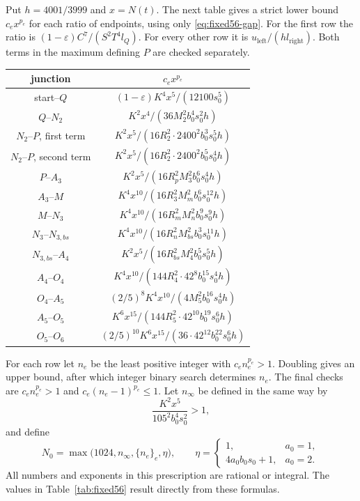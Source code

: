 \documentclass[12pt]{article}
\numberwithin{equation}{section}
\begin{document}
Put $h=4001/3999$ and $x=N(t)$.
The next table gives a strict lower bound $c_ex^{p_e}$ for each
ratio of endpoints, using only \eqref{eq:fixed56-gap}.
For the first row the ratio is $(1-\varepsilon)C^7/(S^2T^4l_Q)$.
For every other row it is $u_{\mathrm{left}}/(hl_{\mathrm{right}})$.
Both terms in the maximum defining $P$ are checked separately.
\begin{center}\small
\begin{tabular}{c|c}
junction&$c_ex^{p_e}$\\\hline
start--$Q$&$(1-\varepsilon)K^4x^5/(12100s_0^5)$\\
$Q$--$N_2$&$K^2x^4/(36M_2^2b_0^4s_0^2h)$\\
$N_2$--$P$, first term&$K^2x^5/(16R_2^2\cdot2400^2b_0^3s_0^5h)$\\
$N_2$--$P$, second term&$K^2x^5/(16R_2^2\cdot2400^2b_0^5s_0^4h)$\\
$P$--$A_3$&$K^2x^5/(16R_p^2M_3^2b_0^6s_0^4h)$\\
$A_3$--$M$&$K^4x^{10}/(16R_3^2M_m^2b_0^6s_0^{12}h)$\\
$M$--$N_3$&$K^4x^{10}/(16R_m^2M_n^2b_0^9s_0^9h)$\\
$N_3$--$N_{3,bs}$&$K^4x^{10}/(16R_n^2M_{bs}^2b_0^3s_0^{11}h)$\\
$N_{3,bs}$--$A_4$&$K^2x^5/(16R_{bs}^2M_4^2b_0^5s_0^5h)$\\
$A_4$--$O_4$&$K^4x^{10}/(144R_4^2\cdot42^8b_0^{15}s_0^4h)$\\
$O_4$--$A_5$&$(2/5)^8K^4x^{10}/(4M_5^2b_0^{16}s_0^4h)$\\
$A_5$--$O_5$&$K^6x^{15}/(144R_5^2\cdot42^{10}b_0^{19}s_0^6h)$\\
$O_5$--$O_6$&$(2/5)^{10}K^6x^{15}/(36\cdot42^{12}b_0^{22}s_0^6h)$
\end{tabular}
\end{center}
For each row let $n_e$ be the least positive integer with $c_en_e^{p_e}>1$.
Doubling gives an upper bound, after which integer binary search
determines $n_e$. The final checks are $c_en_e^{p_e}>1$ and
$c_e(n_e-1)^{p_e}\le1$.
Let $n_\infty$ be defined in the same way by
\[
 \frac{K^2x^5}{105^2b_0^4s_0^2}>1,
\]
and define
\begin{equation*}
 N_0=\max\bigl(1024,n_\infty,\{n_e\}_e,\eta\bigr),\qquad
 \eta=\begin{cases}1,&a_0=1,\\4a_0b_0s_0+1,&a_0=2.\end{cases}
\end{equation*}
All numbers and exponents in this prescription are rational or integral.
The values in Table~\ref{tab:fixed56} result directly from these formulas.
\end{document}
